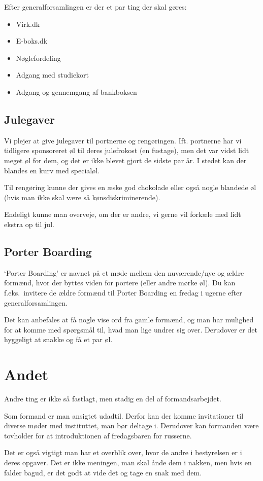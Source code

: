 Efter generalforsamlingen er der et par ting der skal gøres:
\begin{itemize}
    \item Virk.dk
    \item E-boks.dk
    \item Nøglefordeling
    \item Adgang med studiekort
    \item Adgang og gennemgang af bankboksen
\end{itemize}


\subsection{Julegaver}
\label{sec:julegaver}

Vi plejer at give julegaver til portnerne og
rengøringen. Ift. portnerne har vi tidligere sponsoreret øl til deres
julefrokost (en fustage), men det var vidst lidt meget øl for dem, og
det er ikke blevet gjort de sidste par år. I stedet kan der blandes en
kurv med specialøl.

Til rengøring kunne der gives en æske god chokolade eller også nogle
blandede øl (hvis man ikke skal være så kønsdiskriminerende).

Endeligt kunne man overveje, om der er andre, vi gerne vil forkæle med
lidt ekstra op til jul.

\subsection{Porter Boarding}
\label{sec:porter-boarding}

`Porter Boarding' er navnet på et møde mellem den nuværende/nye
og ældre formænd, hvor der byttes viden for portere (eller andre mørke
øl).
Du kan f.eks.~invitere de ældre formænd til Porter Boarding en fredag i ugerne efter
generalforsamlingen.

Det kan anbefales at få nogle vise ord fra gamle formænd, og man har
mulighed for at komme med spørgsmål til, hvad man lige undrer sig
over. Derudover er det hyggeligt at snakke og få et par øl.


\section{Andet}
\label{sec:andet}

Andre ting er ikke så fastlagt, men stadig en del af formandsarbejdet.

Som formand er man ansigtet udadtil. Derfor kan der komme invitationer
til diverse møder med instituttet, man bør deltage i.
Derudover kan formanden være tovholder for at introduktionen af fredagsbaren for
russerne.

Det er også vigtigt man har et overblik over, hvor de andre i
bestyrelsen er i deres opgaver. Det er ikke meningen, man skal ånde
dem i nakken, men hvis en falder bagud, er det godt at vide det og
tage en snak med dem.



